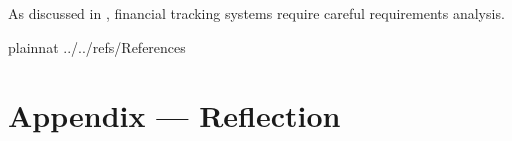 \documentclass[12pt]{article}
\begin{document}



\newpage

As discussed in \citet{Ref1}, financial tracking systems require careful requirements analysis.

 {plainnat}
 {../../refs/References}

\newpage

\section*{Appendix --- Reflection}
\end{document}
